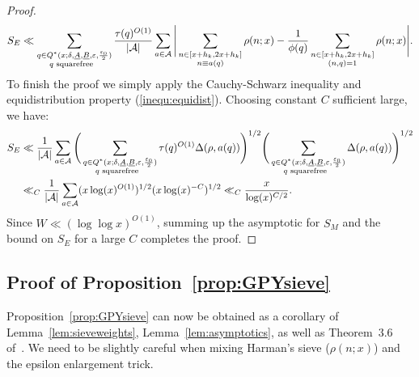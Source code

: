 \documentclass{amsart}
\numberwithin{equation}{section}
\begin{document}
\begin{proof}
\begin{align*}
S_{E} \ll \sum_{\substack{q \in Q^*(x;\delta,\underline{A},\underline{B},\varepsilon,\frac{\varepsilon_0}{2})  \\ q \mbox{\begin{scriptsize}
   squarefree
  \end{scriptsize} }   }}  \frac{\tau(q)^{O(1)}}{|\mathcal{A}|} \sum_{a \in \mathcal{A}} \Bigg| \sum_{\substack{n \in [x+h_k,2x+h_k] \\ n \equiv a (q)}} \rho(n;x) - \dfrac{1}{\phi(q)} \sum_{\substack{n \in [x+h_k,2x+h_k] \\(n,q)=1 }}\rho(n;x) \Bigg|.
  \end{align*}
  To finish the proof we simply apply the Cauchy-Schwarz inequality and equidistribution property (\ref{inequ:equidist}). Choosing constant $C$ sufficient large, we have:  
  \begin{align*}
S_{E} &\ll \frac{1}{|\mathcal{A|}} \sum_{a \in \mathcal{A}}  \Bigg(\sum_{\substack{q \in Q^*(x;\delta,\underline{A},\underline{B},\varepsilon,\frac{\varepsilon_0}{2})  \\ q \mbox{\begin{scriptsize}
   squarefree
  \end{scriptsize} }   }}   \tau(q)^{O(1)} \Delta(\rho,a(q)) \Bigg)^{1/2}\Bigg(\sum_{\substack{q \in Q^*(x;\delta,\underline{A},\underline{B},\varepsilon,\frac{\varepsilon_0}{2})  \\ q \mbox{\begin{scriptsize}
   squarefree
  \end{scriptsize} }   }}    \Delta(\rho,a(q)) \Bigg)^{1/2} \\
  &\ll_C \frac{1}{|\mathcal{A|}} \sum_{a \in \mathcal{A}}  (x \log(x)^{O(1)})^{1/2} (x \log(x)^{-C})^{1/2} \ll_C \frac{x}{\log(x)^{C/2}}.
  \end{align*}
  Since $W \ll (\log\log x)^{O(1)}$, summing up the asymptotic for $S_M$ and the bound on $S_E$ for a large $C$ completes the proof.
 \end{proof}


\subsection{Proof of Proposition~\ref{prop:GPYsieve}}

Proposition~\ref{prop:GPYsieve} can now be obtained as a   corollary of Lemma~\ref{lem:sieveweights}, Lemma~\ref{lem:asymptotics}, as well as Theorem~3.6 of~\cite{Polymath:2014:VSS}. We need to be slightly careful when mixing Harman's sieve ($\rho(n;x)$) and the epsilon enlargement trick.
\end{document}
